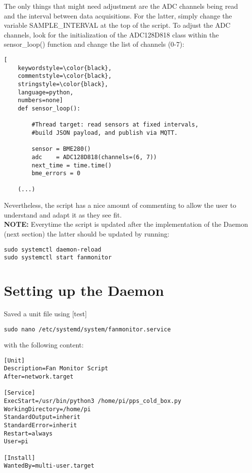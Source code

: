 \documentclass[onecolumn]{article}
\begin{document}
The only things that might need adjustment are the ADC channels being read and the interval between data acquisitions. For the latter, simply change the variable SAMPLE\_INTERVAL at the top of the script. To adjust the ADC channels, look for the initialization of the ADC128D818 class within the sensor\_loop() function and change the list of channels (0-7):

\begin{lstlisting}[
    keywordstyle=\color{black},
    commentstyle=\color{black},
    stringstyle=\color{black},
    language=python,
    numbers=none]
    def sensor_loop():
        
        #Thread target: read sensors at fixed intervals,
        #build JSON payload, and publish via MQTT.
        
        sensor = BME280()
        adc    = ADC128D818(channels=(6, 7))
        next_time = time.time()
        bme_errors = 0

    (...)
\end{lstlisting}

Nevertheless, the script has a nice amount of commenting to allow the user to understand and adapt it as they see fit.\\

\textbf{NOTE:} Everytime the script is updated after the implementation of the Daemon (next section) the latter should be updated by running:

\begin{lstlisting}[numbers=none]
sudo systemctl daemon-reload
sudo systemctl start fanmonitor
\end{lstlisting}

\newpage

\section{Setting up the Daemon}

Saved a unit file using [test] 

\begin{lstlisting}[numbers=none]
    sudo nano /etc/systemd/system/fanmonitor.service
\end{lstlisting}
    
with the following content:\\


\begin{lstlisting}[numbers=none]
[Unit]
Description=Fan Monitor Script
After=network.target

[Service]
ExecStart=/usr/bin/python3 /home/pi/pps_cold_box.py
WorkingDirectory=/home/pi
StandardOutput=inherit
StandardError=inherit
Restart=always
User=pi

[Install]
WantedBy=multi-user.target
\end{lstlisting}
\end{document}
